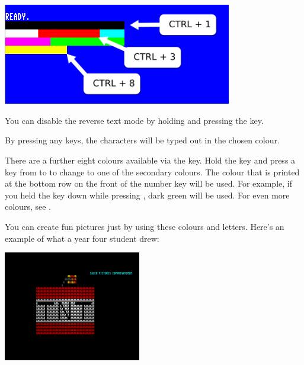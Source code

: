 \begin{center}
\includegraphics[width={10cm}]{images/introduction-screen/colour-bars.png}
\end{center}


You can disable the reverse text mode by holding  and pressing the  key.

By pressing any keys, the characters will be typed out in the chosen colour.

There are a further eight colours available via the \megasymbolkey key. Hold the \megasymbolkey key and press a key from  to  to change to one of the secondary colours. The colour that is printed at the bottom row on the front of the number key will be used. For example, if you held the \megasymbolkey key down while pressing , dark green will be used. For even more colours, see .

\needspace{4cm}
You can create fun pictures just by using these colours and letters.  Here's an example of what a year four student drew:

\begin{center}
\includegraphics[width={6cm}]{images/caleb-PETSCII-TNT-final}
\end{center}

